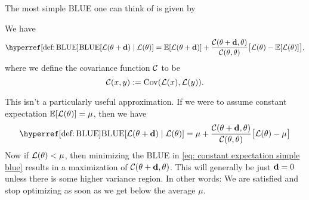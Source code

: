 The most simple BLUE one can think of is given by

\begin{lemma}\label{lem: one-step zero-order blue}
	We have
	\begin{equation*}
		\BLUE[\Loss(\param + \step) \mid \Loss(\param)]
		= \E[\Loss(\param + \step)]
		+ \frac{\C(\param+\step,\param)}{\C(\param, \param)}
		\big[\Loss(\param) - \E[\Loss(\param)]\big],
	\end{equation*}
	where we define the covariance function \(\mathcal{C}\) to be
	\begin{equation*}
		\mathcal{C}(x,y):= \operatorname{Cov}(\mathcal{L}(x), \mathcal{L}(y)).
	\end{equation*}
\end{lemma}

This isn't a particularly useful approximation. If we were to assume constant
expectation \(\mathbb{E}[\mathcal{L}(\theta)] = \mu\), then we have
\begin{equation}\label{eq: constant expectation simple blue}
	\BLUE[\Loss(\param + \step) \mid \Loss(\param)]
	=\mu 
	+ \frac{\C(\param+\step,\param)}{\C(\param, \param)}
	\big[\Loss(\param) - \mu\big]
\end{equation}
Now if \(\mathcal{L}(\theta) < \mu\), then minimizing the BLUE in
\eqref{eq: constant expectation simple blue} results in a maximization of
\(\mathcal{C}(\theta+\mathbf{d}, \theta)\). This will generally be just \(\mathbf{d}=0\) unless
there is some higher variance region. In other words: We are satisfied and
stop optimizing as soon as we get below the average \(\mu\).

